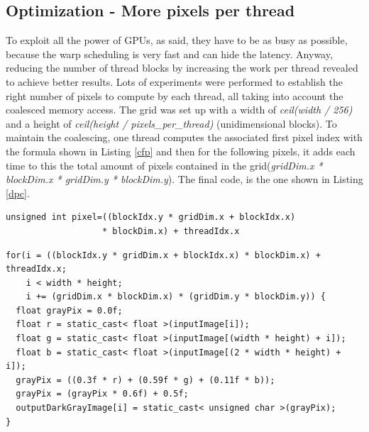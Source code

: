 \documentclass[a4paper]{article}
\begin{document}
\subsection{Optimization - More pixels per thread}
\label{sec:dfm}
To exploit all the power of GPUs, as said, they have to be as busy as possible, because the warp scheduling is very fast and can hide the latency. Anyway, reducing the number of thread blocks by increasing the work per thread revealed to achieve better results. Lots of experiments were performed to establish the right number of pixels to compute by each thread, all taking into account the coalesced memory access. The grid was set up with a width of \textit{ceil(width / 256)} and a height of \textit{ceil(height / pixels\_per\_thread)} (unidimensional blocks). To maintain the coalescing, one thread computes the associated first pixel index with the formula shown in Listing \ref{cfp} and then for the following pixels, it adds each time to this the total amount of pixels contained in the grid(\textit{gridDim.x * blockDim.x * gridDim.y * blockDim.y}). The final code, is the one shown in Listing \ref{dpc}. 

\begin{lstlisting}[label=cfp, caption=Corresponding first pixel]
unsigned int pixel=((blockIdx.y * gridDim.x + blockIdx.x) 
                   * blockDim.x) + threadIdx.x
\end{lstlisting}
\FloatBarrier

\begin{lstlisting}[label=dpc, caption=Darker Parallel Code]
for(i = ((blockIdx.y * gridDim.x + blockIdx.x) * blockDim.x) + threadIdx.x; 
    i < width * height; 
    i += (gridDim.x * blockDim.x) * (gridDim.y * blockDim.y)) {
  float grayPix = 0.0f;
  float r = static_cast< float >(inputImage[i]);
  float g = static_cast< float >(inputImage[(width * height) + i]);
  float b = static_cast< float >(inputImage[(2 * width * height) + i]);
  grayPix = ((0.3f * r) + (0.59f * g) + (0.11f * b));
  grayPix = (grayPix * 0.6f) + 0.5f;
  outputDarkGrayImage[i] = static_cast< unsigned char >(grayPix);
}
\end{lstlisting}
\FloatBarrier
\end{document}
